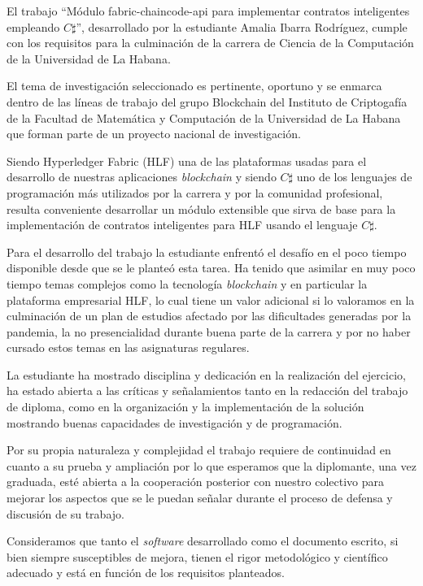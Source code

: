 \begin{opinion}
El trabajo “Módulo fabric-chaincode-api para implementar contratos inteligentes empleando $C \sharp$”, desarrollado por la estudiante Amalia Ibarra Rodríguez, cumple con los requisitos para la culminación de la carrera de Ciencia de la Computación de la Universidad de La Habana.

El tema de investigación seleccionado es pertinente, oportuno y se enmarca dentro de las líneas de trabajo del grupo Blockchain del Instituto de Criptogafía de la Facultad de Matemática y Computación de la Universidad de La Habana que forman parte de un proyecto nacional de investigación.

Siendo Hyperledger Fabric (HLF) una de las plataformas usadas para el desarrollo de nuestras aplicaciones \textit{blockchain} y siendo $C \sharp$ uno de los lenguajes de programación más utilizados por la carrera y por la comunidad profesional, resulta conveniente desarrollar un módulo extensible que sirva de base para la implementación de contratos inteligentes para HLF usando el lenguaje $C \sharp$.

Para el desarrollo del trabajo la estudiante enfrentó el desafío en el poco tiempo disponible desde que se le planteó esta tarea. Ha tenido que asimilar en muy poco tiempo temas complejos como la tecnología \textit{blockchain} y en particular la plataforma empresarial HLF, lo cual tiene un valor adicional si lo valoramos en la culminación de un plan de estudios afectado por las dificultades generadas por la pandemia, la no presencialidad durante buena parte de la carrera y por no haber cursado estos temas en las asignaturas regulares.

La estudiante ha mostrado disciplina y dedicación en la realización del ejercicio, ha estado abierta a las críticas y señalamientos tanto en la redacción del trabajo de diploma, como en la organización y la implementación de la solución mostrando buenas capacidades de investigación y de programación.

Por su propia naturaleza y complejidad el trabajo requiere de continuidad en cuanto a su prueba y ampliación por lo que esperamos que la diplomante, una vez graduada, esté abierta a la cooperación posterior con nuestro colectivo para mejorar los aspectos que se le puedan señalar durante el proceso de defensa y discusión de su trabajo.
 
Consideramos que tanto el \textit{software} desarrollado como el documento escrito, si bien siempre susceptibles de mejora, tienen el rigor metodológico y científico adecuado y está en función de los requisitos planteados.


\end{opinion}
